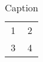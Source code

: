 \begin{table}[]
    \centering
    \begin{tabular}{|c|c|}
        1 & 2 \\
        3 & 4
    \end{tabular}
    \caption{Caption}
    \label{tab:my_label}
\end{table}
